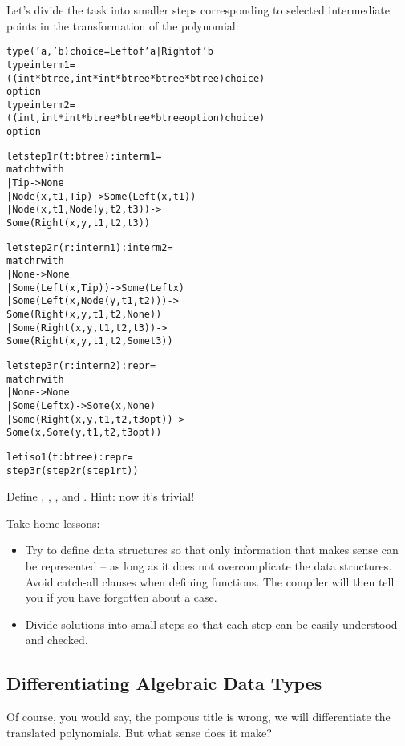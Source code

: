 \documentclass{article}
\newcommand{\tmverbatim}[1]{\text{{\ttfamily{#1}}}}
\newenvironment{tmcode}[1][]{\begin{alltt} }{\end{alltt}}
\begin{document}
Let's divide the task into smaller steps corresponding to selected
intermediate points in the transformation of the polynomial:
\begin{tmcode}
type ('a, 'b) choice = Left of 'a | Right of 'b
type interm1 =
  ((int * btree, int * int * btree * btree * btree) choice)
  option
type interm2 =
  ((int, int * int * btree * btree * btree option) choice)
  option

let step1r (t : btree) : interm1 =
  match t with
    | Tip -> None
    | Node (x, t1, Tip) -> Some (Left (x, t1))
    | Node (x, t1, Node (y, t2, t3)) ->
      Some (Right (x, y, t1, t2, t3))

let step2r (r : interm1) : interm2 =
  match r with
    | None -> None
    | Some (Left (x, Tip)) -> Some (Left x)
    | Some (Left (x, Node (y, t1, t2))) ->
      Some (Right (x, y, t1, t2, None))
    | Some (Right (x, y, t1, t2, t3)) ->
      Some (Right (x, y, t1, t2, Some t3))

let step3r (r : interm2) : repr =
  match r with
    | None -> None
    | Some (Left x) -> Some (x, None)
    | Some (Right (x, y, t1, t2, t3opt)) ->
      Some (x, Some (y, t1, t2, t3opt))

let iso1 (t : btree) : repr =
  step3r (step2r (step1r t))
\end{tmcode}
Define \tmverbatim{step1l}, \tmverbatim{step2l}, \tmverbatim{step3l}, and
\tmverbatim{iso2}. Hint: now it's trivial!{\newpage}

Take-home lessons:
\begin{itemize}
  \item Try to define data structures so that only information that makes
  sense can be represented -- as long as it does not overcomplicate the data
  structures. Avoid catch-all clauses when defining functions. The compiler
  will then tell you if you have forgotten about a case.
  
  \item Divide solutions into small steps so that each step can be easily
  understood and checked.
\end{itemize}

\subsection{Differentiating Algebraic Data Types}

Of course, you would say, the pompous title is wrong, we will differentiate
the translated polynomials. But what sense does it make?
\end{document}
